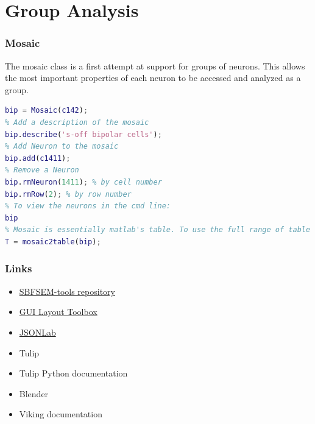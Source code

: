 \documentclass[11pt]{beamer}
\begin{document}
\section{Group Analysis}
\begin{frame}[fragile]
	\frametitle{Mosaic}
	The mosaic class is a first attempt at support for groups of neurons. This allows the most important properties of each neuron to be accessed and analyzed as a group.
	\begin{lstlisting}[language=matlab]
% Create a Mosaic by passing in the first Neuron
bip = Mosaic(c142);
% Add a description of the mosaic
bip.describe('s-off bipolar cells');
% Add Neuron to the mosaic
bip.add(c1411);
% Remove a Neuron
bip.rmNeuron(1411); % by cell number
bip.rmRow(2); % by row number
% To view the neurons in the cmd line:
bip
% Mosaic is essentially matlab's table. To use the full range of table methods, cast to table:
T = mosaic2table(bip);
\end{lstlisting} 
\end{frame}
\begin{frame}
	\frametitle{Links}
	\begin{itemize}
		\item \href{www.github.com/sarastokes/sbfsem-tools}{SBFSEM-tools repository}
		\item \href{https://www.mathworks.com/matlabcentral/fileexchange/47982-gui-layout-toolbox}{GUI Layout Toolbox}
		\item \href{https://www.mathworks.com/matlabcentral/fileexchange/33381-jsonlab--a-toolbox-to-encode-decode-json-files}{JSONLab}
		\item Tulip
		\item Tulip Python documentation
		\item Blender
		\item Viking documentation
	\end{itemize}
\end{frame}	
\end{document}
